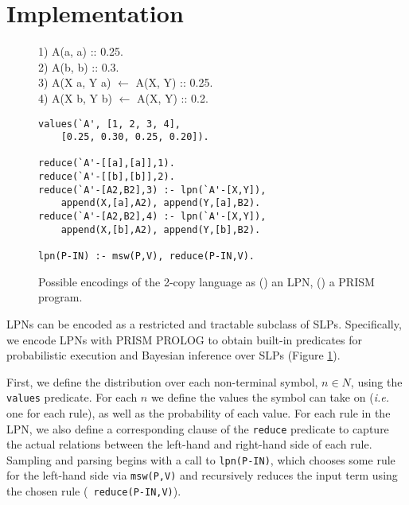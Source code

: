 \documentclass[11pt, twocolumn]{article}
\begin{document}
\section{Implementation}


\begin{figure}[t]
	\centering
	\begin{minipage}[b]{0.8\linewidth}
1) A(a, a) :: 0.25. \\
2) A(b, b) :: 0.3. \\
3) A(X a, Y a) $\leftarrow$ A(X, Y) :: 0.25. \\
4) A(X b, Y b) $\leftarrow$ A(X, Y) :: 0.2.
		\subcaption{}
		\label{fig:grammar}
	\end{minipage}
	\begin{minipage}[b]{0.8\linewidth}
        \fontsize{9}{10.5}\selectfont\ttfamily
		\begin{verbatim}
values(`A', [1, 2, 3, 4],
    [0.25, 0.30, 0.25, 0.20]).

reduce(`A'-[[a],[a]],1).
reduce(`A'-[[b],[b]],2).
reduce(`A'-[A2,B2],3) :- lpn(`A'-[X,Y]),
    append(X,[a],A2), append(Y,[a],B2).
reduce(`A'-[A2,B2],4) :- lpn(`A'-[X,Y]),
    append(X,[b],A2), append(Y,[b],B2).

lpn(P-IN) :- msw(P,V), reduce(P-IN,V).
		\end{verbatim}
		\subcaption{}
		\label{fig:prism}
	\end{minipage}
	\caption{Possible encodings of the 2-copy language as () an LPN, () a PRISM program.}
	\label{fig:copy}
\end{figure}

LPNs can be encoded as a restricted and tractable subclass of
SLPs. Specifically, we encode LPNs with PRISM PROLOG to obtain
built-in predicates for probabilistic execution and Bayesian inference
over SLPs (Figure \ref{fig:copy}).

First, we define the distribution over each non-terminal symbol, $n
\in N$, using the {\tt values} predicate. For each $n$ we define the
values the symbol can take on ({\it i.e.} one for each rule), as well
as the probability of each value. For each rule in the LPN, we also
define a corresponding clause of the {\tt reduce} predicate to capture
the actual relations between the left-hand and right-hand side of each
rule. Sampling and parsing begins with a call to {\tt lpn(P-IN)},
which chooses some rule for the left-hand side via {\tt msw(P,V)} and
recursively reduces the input term using the chosen rule ({\tt
reduce(P-IN,V)}).
\end{document}
